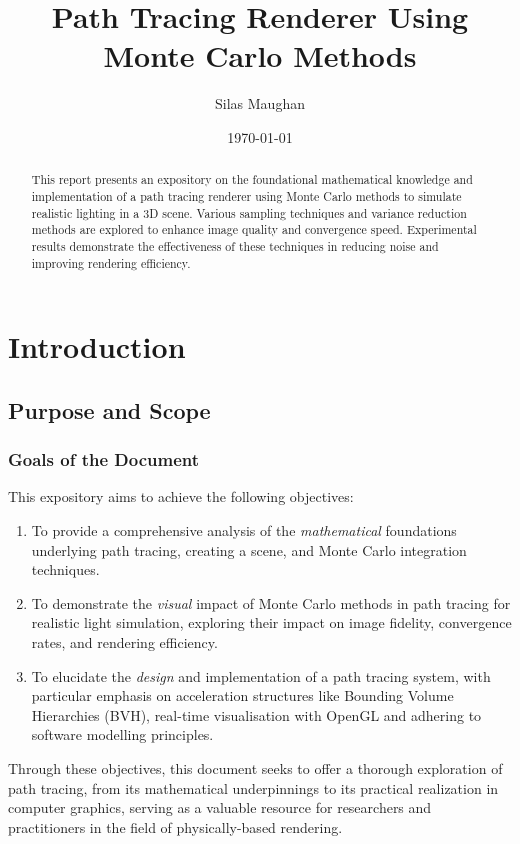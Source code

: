 \documentclass[12pt]{article}
\title{Path Tracing Renderer Using Monte Carlo Methods}
\author{Silas Maughan}
\date{\today}
\begin{document}
\maketitle
\begin{abstract}
    This report presents an expository on the foundational mathematical knowledge and implementation of a path tracing renderer using Monte Carlo methods to simulate realistic lighting in a 3D scene. Various sampling techniques and variance reduction methods are explored to enhance image quality and convergence speed. Experimental results demonstrate the effectiveness of these techniques in reducing noise and improving rendering efficiency.
\end{abstract}

\tableofcontents
\break
\section{Introduction}
\label{sec:intro}
\subsection{Purpose and Scope}
\subsubsection{Goals of the Document}

This expository aims to achieve the following objectives:
\begin{enumerate}
    \item To provide a comprehensive analysis of the \textit{mathematical} foundations underlying path tracing, creating a scene, and Monte Carlo integration techniques.

    \item To demonstrate the \textit{visual} impact of Monte Carlo methods in path tracing for realistic light simulation, exploring their impact on image fidelity, convergence rates, and rendering efficiency.

    \item To elucidate the \textit{design} and implementation of a path tracing system, with particular emphasis on acceleration structures like Bounding Volume Hierarchies (BVH), real-time visualisation with OpenGL and adhering to software modelling principles.
\end{enumerate}

Through these objectives, this document seeks to offer a thorough exploration of path tracing, from its mathematical underpinnings to its practical realization in computer graphics, serving as a valuable resource for researchers and practitioners in the field of physically-based rendering.
\end{document}
